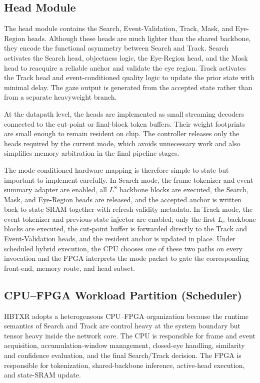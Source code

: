\documentclass[journal]{IEEEtran}
\begin{document}
\subsection{Head Module}
The head module contains the Search, Event-Validation, Track, Mask, and Eye-Region heads. Although these heads are much lighter than the shared backbone, they encode the functional asymmetry between Search and Track. Search activates the Search head, objectness logic, the Eye-Region head, and the Mask head to reacquire a reliable anchor and validate the eye region. Track activates the Track head and event-conditioned quality logic to update the prior state with minimal delay. The gaze output is generated from the accepted state rather than from a separate heavyweight branch.

At the datapath level, the heads are implemented as small streaming decoders connected to the cut-point or final-block token buffers. Their weight footprints are small enough to remain resident on chip. The controller releases only the heads required by the current mode, which avoids unnecessary work and also simplifies memory arbitration in the final pipeline stages.

The mode-conditioned hardware mapping is therefore simple to state but important to implement carefully. In Search mode, the frame tokenizer and event-summary adapter are enabled, all $L^{\mathrm S}$ backbone blocks are executed, the Search, Mask, and Eye-Region heads are released, and the accepted anchor is written back to state SRAM together with refresh-validity metadata. In Track mode, the event tokenizer and previous-state injector are enabled, only the first $L_c$ backbone blocks are executed, the cut-point buffer is forwarded directly to the Track and Event-Validation heads, and the resident anchor is updated in place. Under scheduled hybrid execution, the CPU chooses one of these two paths on every invocation and the FPGA interprets the mode packet to gate the corresponding front-end, memory route, and head subset.

\subsection{CPU--FPGA Workload Partition (Scheduler)}
HBTXR adopts a heterogeneous CPU--FPGA organization because the runtime semantics of Search and Track are control heavy at the system boundary but tensor heavy inside the network core. The CPU is responsible for frame and event acquisition, accumulation-window management, closed-eye handling, similarity and confidence evaluation, and the final Search/Track decision. The FPGA is responsible for tokenization, shared-backbone inference, active-head execution, and state-SRAM update.
\end{document}
